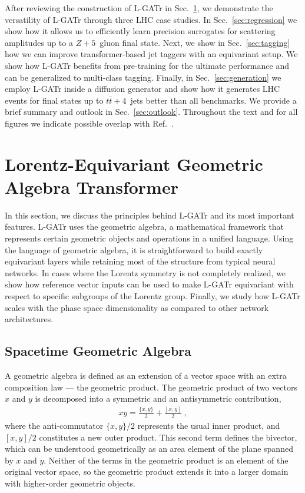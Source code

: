 \documentclass[submission, Phys]{SciPost}
\begin{document}
After reviewing the construction of L-GATr in Sec.~\ref{sec:lgatr}, we demonstrate the versatility of L-GATr through three LHC case studies. In Sec.~\ref{sec:regression} we show how it allows us to efficiently learn precision surrogates for scattering amplitudes up to a $Z+5$~gluon final state. Next, we show in Sec.~\ref{sec:tagging} how we can improve transformer-based jet taggers with an equivariant setup. We show how L-GATr benefits from pre-training for the ultimate performance and can be generalized to multi-class tagging. Finally, in Sec.~\ref{sec:generation} we employ L-GATr inside a diffusion generator and show how it generates LHC events for final states up to $t\bar{t}+4$~jets better than all benchmarks. 
%
We provide a brief summary and outlook in Sec.~\ref{sec:outlook}.
%
Throughout the text and for all figures we indicate possible overlap with Ref.~\cite{Spinner:2024hjm}.

\section{Lorentz-Equivariant Geometric Algebra Transformer}
\label{sec:lgatr}

In this section, we discuss the principles behind L-GATr and its most important features. L-GATr uses the geometric algebra, a mathematical framework that represents certain geometric objects and operations in a unified language. Using the language of geometric algebra, it is straightforward to build exactly equivariant layers while retaining most of the structure from typical neural networks. In cases where the Lorentz symmetry is not completely realized, we show how reference vector inputs can be used to make L-GATr equivariant with respect to specific subgroups of the Lorentz group. Finally, we study how L-GATr scales with the phase space dimensionality as compared to other network architectures.

\subsection{Spacetime Geometric Algebra}
\label{sec:algebra}

A geometric algebra is defined as an extension of a vector space with an extra composition law --- the geometric product. The geometric product of two vectors $x$ and $y$ is decomposed into a symmetric and an antisymmetric contribution,
%
\begin{align}
    xy = \frac{\{x,y \}}{2} + \frac{[x,y]}{2}  \; ,
    \label{eq:xy_gen}
\end{align}
%
where the anti-commutator $\{x,y \}/2$ represents the usual inner product, and $[x,y]/2$ constitutes a new outer product. This second term defines the bivector, which can be understood geometrically as an area element of the plane spanned by $x$ and $y$. Neither of the terms in the geometric product is an element of the original vector space, so the geometric product extends it into a larger domain with higher-order geometric objects.
\end{document}
